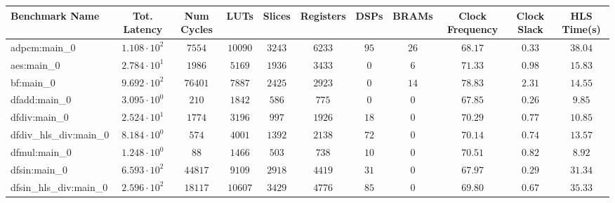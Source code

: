 \begin{tabular}{|l|c|c|c|c|c|c|c|c|c|c|}
\hline
Benchmark Name          & Tot. Latency           & Num Cycles & LUTs      & Slices    & Registers & DSPs    & BRAMs   & Clock Frequency & Clock Slack & HLS Time(s) \\
\hline
adpcm:main\_0           & $ 1.108 \cdot 10^{2} $ & $ 7554   $ & $ 10090 $ & $ 3243  $ & $ 6233  $ & $ 95  $ & $ 26  $ & $ 68.17       $ & $ 0.33    $ & $ 38.04   $ \\
aes:main\_0             & $ 2.784 \cdot 10^{1} $ & $ 1986   $ & $ 5169  $ & $ 1936  $ & $ 3433  $ & $ 0   $ & $ 6   $ & $ 71.33       $ & $ 0.98    $ & $ 15.83   $ \\
bf:main\_0              & $ 9.692 \cdot 10^{2} $ & $ 76401  $ & $ 7887  $ & $ 2425  $ & $ 2923  $ & $ 0   $ & $ 14  $ & $ 78.83       $ & $ 2.31    $ & $ 14.55   $ \\
dfadd:main\_0           & $ 3.095 \cdot 10^{0} $ & $ 210    $ & $ 1842  $ & $ 586   $ & $ 775   $ & $ 0   $ & $ 0   $ & $ 67.85       $ & $ 0.26    $ & $ 9.85    $ \\
dfdiv:main\_0           & $ 2.524 \cdot 10^{1} $ & $ 1774   $ & $ 3196  $ & $ 997   $ & $ 1926  $ & $ 18  $ & $ 0   $ & $ 70.29       $ & $ 0.77    $ & $ 10.85   $ \\
dfdiv\_hls\_div:main\_0 & $ 8.184 \cdot 10^{0} $ & $ 574    $ & $ 4001  $ & $ 1392  $ & $ 2138  $ & $ 72  $ & $ 0   $ & $ 70.14       $ & $ 0.74    $ & $ 13.57   $ \\
dfmul:main\_0           & $ 1.248 \cdot 10^{0} $ & $ 88     $ & $ 1466  $ & $ 503   $ & $ 738   $ & $ 10  $ & $ 0   $ & $ 70.51       $ & $ 0.82    $ & $ 8.92    $ \\
dfsin:main\_0           & $ 6.593 \cdot 10^{2} $ & $ 44817  $ & $ 9109  $ & $ 2918  $ & $ 4419  $ & $ 31  $ & $ 0   $ & $ 67.97       $ & $ 0.29    $ & $ 31.34   $ \\
dfsin\_hls\_div:main\_0 & $ 2.596 \cdot 10^{2} $ & $ 18117  $ & $ 10607 $ & $ 3429  $ & $ 4776  $ & $ 85  $ & $ 0   $ & $ 69.80       $ & $ 0.67    $ & $ 35.33   $ \\

\end{tabular}
